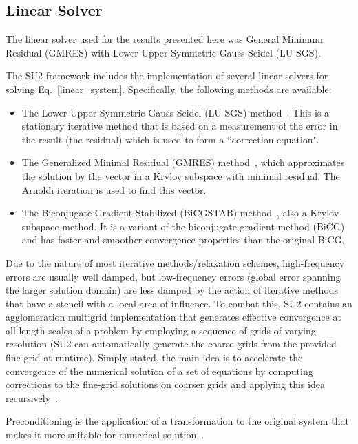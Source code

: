 
\subsection*{Linear Solver}
The linear solver used for the results presented here was General Minimum Residual (GMRES) with Lower-Upper Symmetric-Gauss-Seidel (LU-SGS). 




The SU2 framework includes the implementation of several linear solvers for solving Eq.~\ref{linear_system}. Specifically, the following methods are available:
\begin{itemize}
\item The Lower-Upper Symmetric-Gauss-Seidel (LU-SGS) method~\cite{yoon88, jameson81b, jameson87}. This is a stationary iterative method that is based on a measurement of the error in the result (the residual) which is used to form a ``correction equation".
\item The Generalized Minimal Residual (GMRES) method~\cite{Saad:1986}, which approximates the solution by the vector in a Krylov subspace with minimal residual. The Arnoldi iteration is used to find this vector.
\item The Biconjugate Gradient Stabilized  (BiCGSTAB) method~\cite{Vorst1992}, also a Krylov subspace method. It is a variant of the biconjugate gradient method (BiCG) and has faster and smoother convergence properties than the original BiCG.
\end{itemize}


Due to the nature of most iterative methods/relaxation schemes, high-frequency errors are usually well damped, but low-frequency errors (global error spanning the larger solution domain) are less damped by the action of iterative methods that have a stencil with a local area of influence. To combat this, SU2 contains an agglomeration multigrid implementation that generates effective convergence at all length scales of a problem by employing a sequence of grids of varying resolution (SU2 can automatically generate the coarse grids from the provided fine grid at runtime). Simply stated, the main idea is to accelerate the convergence of the numerical solution of a set of equations by computing corrections to the fine-grid solutions on coarser grids and applying this idea recursively~\cite{jameson86, mavriplis1998, mavriplis1995, borzi-2003, palacios-2011}. 

Preconditioning is the application of a transformation to the original system that makes it more suitable for numerical solution~\cite{pierce-1997}.